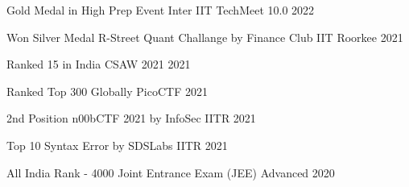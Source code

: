 


\begin{cvhonors}


  \cvhonor
{Gold Medal in High Prep Event} %
{Inter IIT TechMeet 10.0}  %
{} %
{2022} %

  \cvhonor
{Won Silver Medal} %
{R-Street Quant Challange by Finance Club IIT Roorkee}  %
{} %
{2021} %

  \cvhonor
{Ranked 15 in India} %
{CSAW 2021}  %
{} %
{2021} %

  \cvhonor
{Ranked Top 300 Globally} %
{PicoCTF}  %
{} %
{2021} %


  \cvhonor
{2nd Position} %
{n00bCTF 2021 by InfoSec IITR}  %
{} %
{2021} %

  \cvhonor
{Top 10} %
{Syntax Error by SDSLabs IITR}  %
{} %
{2021} %

  \cvhonor
{All India Rank - 4000} %
{Joint Entrance Exam (JEE) Advanced }  %
{} %
{2020} %






	


\end{cvhonors}

